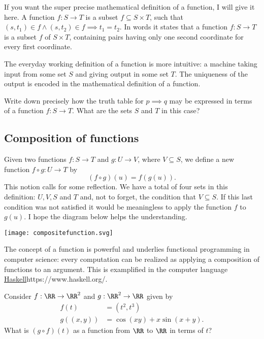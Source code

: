 \documentclass{article}
\begin{document}
If you want the  super precise mathematical definition of a function, I
will give it here.  A function $f: S\rightarrow T$ is a subset
$f\subseteq S\times T$, such that
$(s, t_1)\in f \land (s, t_2)\in f \implies t_1 = t_2$. In words it states that a
function $f: S\rightarrow T$ is a subset $f$ of $S\times T$, containing pairs
having only one second coordinate for every first coordinate.

The everyday working definition of a
function is more intuitive: a machine taking input from some set
$S$ and giving output in some set $T$. The uniqueness of the output
is encoded in the mathematical definition of a function.


\beginshex
Write down precisely how the truth table for $p\implies q$ may
be expressed in terms of a function $f: S\rightarrow T$. What are the sets $S$ and $T$ in this case?
\endshex


\subsection{Composition of functions}

Given two functions $f: S\rightarrow T$ and $g: U\rightarrow V$, where
$V\subseteq S$, we define a new function $f\circ g: U \rightarrow T$ by
$$
(f\circ g)(u) = f(g(u)).
$$
This notion calls for some reflection. We have a total of four sets
in this definition: $U, V, S$ and $T$ and, not to forget, the condition that
$V\subseteq S$. If this last condition was not satisfied it would be
meaningless to apply the function $f$ to $g(u)$.
I hope the diagram below helps the
understanding.

\texttt{[image: compositefunction.svg]}

\begin{remark}
  The concept of a function is powerful and underlies functional programming in computer science: every computation can be realized as applying a composition of functions to an argument. This is examplified in the computer language
  \url{Haskell}{https://www.haskell.org/}.
  \end{remark}


  
\beginshex
Consider $f: \RR\rightarrow \RR^2$ and $g: \RR^2\rightarrow \RR$ given by
\begin{align*}
  f(t) &= (t^2, t^3)\\
  g((x, y)) &= \cos(x y) + x \sin(x + y).
\end{align*}
What is $(g\circ f)(t)$ as a function from $\RR$ to $\RR$ in terms of $t$?
\endshex
\end{document}
